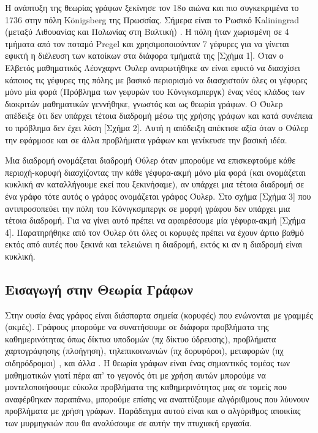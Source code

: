 Η ανάπτυξη της θεωρίας γράφων ξεκίνησε τον 18ο αιώνα και πιο συγκεκριμένα το 1736 στην πόλη  Königsberg της Πρωσσίας. Σήμερα είναι το Ρωσικό  Kaliningrad (μεταξύ Λιθουανίας και Πολωνίας στη Βαλτική) \cite{Μανωλόπουλος}. Η πόλη ήταν χωρισμένη σε 4 τμήματα από τον ποταμό  Pregel και χρησιμοποιούνταν 7 γέφυρες για να γίνεται εφικτή η διέλευση των κατοίκων στα διάφορα τμήματά της [Σχήμα 1]. Όταν ο Ελβετός μαθηματικός Λέονχαρντ Όυλερ αναρωτήθηκε αν είναι εφικτό να διασχίσει κάποιος τις γέφυρες της πόλης με βασικό περιορισμό να διασχιστούν όλες οι γέφυρες μόνο μία φορά (Πρόβλημα των γεφυρών του Κόνιγκσμπεργκ) ένας νέος κλάδος των διακριτών μαθηματικών γεννήθηκε, γνωστός και ως θεωρία γράφων. Ο Όυλερ απέδειξε ότι δεν υπάρχει τέτοια διαδρομή μέσω της χρήσης γράφων και κατά συνέπεια το πρόβλημα δεν έχει λύση [Σχήμα 2]. Αυτή η απόδειξη απέκτισε αξία όταν ο Ούλερ την εφάρμοσε και σε άλλα προβλήματα γράφων και γενίκευσε την βασική ιδέα. 

Μια διαδρομή ονομάζεται διαδρομή Ούλερ όταν μπορούμε να επισκεφτούμε κάθε περιοχή-κορυφή διασχίζοντας την κάθε γέφυρα-ακμή μόνο μία φορά (και ονομάζεται κυκλική αν καταλλήγουμε εκεί που ξεκινήσαμε), αν υπάρχει μια τέτοια διαδρομή σε ένα γράφο τότε αυτός ο γράφος ονομάζεται γράφος Όυλερ. \cite{Ντενισιώτης} Στο σχήμα [Σχήμα 3] που αντιπροσοπεύει την πόλη του Κόνιγκσμπεργκ σε μορφή γράφου δεν υπάρχει μια τέτοια διαδρομή. Για να γίνει αυτό πρέπει να αφαιρέσουμε μία γέφυρα-ακμή [Σχήμα 4]. Παρατηρήθηκε από τον Όυλερ ότι όλες οι κορυφές πρέπει να έχουν άρτιο βαθμό εκτός από αυτές που ξεκινά και τελειώνει η διαδρομή, εκτός κι αν η διαδρομή είναι κυκλική. 


\subsection{Εισαγωγή στην Θεωρία Γράφων}

Στην ουσία ένας γράφος είναι διάσπαρτα σημεία (κορυφές) που ενώνονται με γραμμές (ακμές). Γράφους μπορούμε να συνατήσουμε σε διάφορα προβλήματα της καθημερινότητας όπως δίκτυα υποδομών (πχ δίκτυο ύδρευσης), προβλήματα χαρτογράφησης (πλοήγηση), τηλεπικοινωνιών (πχ δορυφόροι), μεταφορών (πχ σιδηρόδρομοι) , και άλλα \cite{Μανωλόπουλος}. Η θεωρία γράφων είναι ένας σημαντικός τομέας των μαθηματικών γιατί πέρα απ' το γεγονός ότι με χρήση αυτών μπορούμε να μοντελοποιήσουμε εύκολα προβλήματα της καθημερινότητας μας σε τομείς που αναφέρθηκαν παραπάνω, μπορούμε επίσης να αναπτύξουμε αλγόριθμους που λύυνουν προβλήματα με χρήση γράφων. Παράδειγμα αυτού είναι και ο αλγόριθμος αποικίας των μυρμηγκιών που θα αναλύσουμε σε αυτήν την πτυχιακή εργασία.

